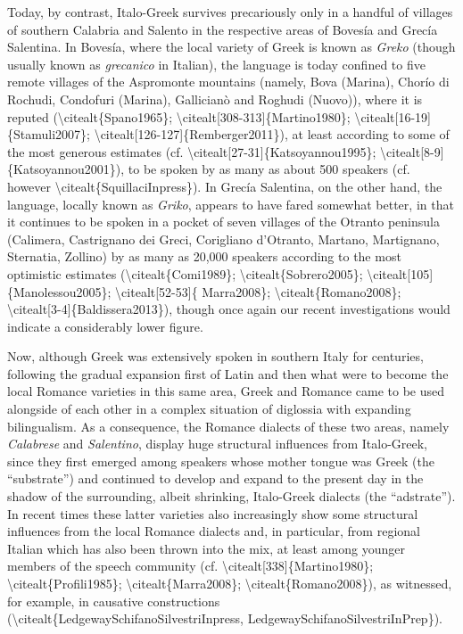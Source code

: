 \documentclass[output=paper,modfonts,nonflat]{langsci/langscibook}
\begin{document}
\begin{styleStandard}
Today, by contrast, Italo-Greek survives precariously only in a handful of villages of southern Calabria and Salento in the respective areas of Bovesía and Grecía Salentina. In Bovesía, where the local variety of Greek is known as \textit{Greko }(though usually known as \textit{grecanico }in Italian), the language is today confined to five remote villages of the Aspromonte mountains (namely, Bova (Marina), Chorío di Rochudi, Condofuri (Marina), Gallicianò and Roghudi (Nuovo)), where it is reputed ({\textbackslash}citealt\{Spano1965\}; {\textbackslash}citealt[308-313]\{Martino1980\}; {\textbackslash}citealt[16-19]\{Stamuli2007\}; {\textbackslash}citealt[126-127]\{Remberger2011\}), at least according to some of the most generous estimates (cf. {\textbackslash}citealt[27-31]\{Katsoyannou1995\}; {\textbackslash}citealt[8-9]\{Katsoyannou2001\}), to be spoken by as many as about 500 speakers (cf. however {\textbackslash}citealt\{SquillaciInpress\}). In Grecía Salentina, on the other hand, the language, locally known as \textit{Griko}, appears to have fared somewhat better, in that it continues to be spoken in a pocket of seven villages of the Otranto peninsula (Calimera, Castrignano dei Greci, Corigliano d’Otranto, Martano, Martignano, Sternatia, Zollino) by as many as 20,000 speakers according to the most optimistic estimates ({\textbackslash}citealt\{Comi1989\}; {\textbackslash}citealt\{Sobrero2005\}; {\textbackslash}citealt[105]\{Manolessou2005\}; {\textbackslash}citealt[52-53]\{ Marra2008\}; {\textbackslash}citealt\{Romano2008\}; {\textbackslash}citealt[3-4]\{Baldissera2013\}), though once again our recent investigations would indicate a considerably lower figure.
\end{styleStandard}

\begin{styleStandard}
Now, although Greek was extensively spoken in southern Italy for centuries, following the gradual expansion first of Latin and then what were to become the local Romance varieties in this same area, Greek and Romance came to be used alongside of each other in a complex situation of diglossia with expanding bilingualism. As a consequence, the Romance dialects of these two areas, namely \textit{Calabrese }and \textit{Salentino}, display huge structural influences from Italo-Greek, since they first emerged among speakers whose mother tongue was Greek (the “substrate”) and continued to develop and expand to the present day in the shadow of the surrounding, albeit shrinking, Italo-Greek dialects (the “adstrate”). In recent times these latter varieties also increasingly show some structural influences from the local Romance dialects and, in particular, from regional Italian which has also been thrown into the mix, at least among younger members of the speech community (cf. {\textbackslash}citealt[338]\{Martino1980\}; {\textbackslash}citealt\{Profili1985\}; {\textbackslash}citealt\{Marra2008\}; {\textbackslash}citealt\{Romano2008\}), as witnessed, for example, in causative constructions ({\textbackslash}citealt\{LedgewaySchifanoSilvestriInpress, LedgewaySchifanoSilvestriInPrep\}).
\end{styleStandard}
\end{document}
